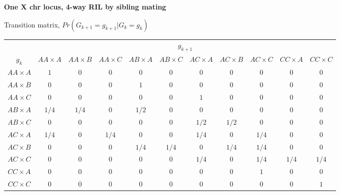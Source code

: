\documentclass[12pt]{article}
\begin{document}
\textbf{\sffamily One X chr locus, 4-way RIL by sibling mating}
\bigskip

\begin{center}
Transition matrix, $Pr(G_{k+1}=g_{k+1} | G_k = g_k)$ \\[6pt]
\renewcommand{\arraystretch}{1.5}\begin{tabular}{ccccccccccc} \hline
& \multicolumn{10}{c}{$g_{k+1}$} \\ \cline{2-11}
$g_k$ & $AA \times A$ & $AA \times B$ & $AA \times C$ & $AB \times A$ & $AB \times C$ & $AC \times A$ & $AC \times B$ & $AC \times C$ & $CC \times A$ & $CC \times C$  \\ \hline 
$AA \times A$ & $1$ & $0$ & $0$ & $0$ & $0$ & $0$ & $0$ & $0$ & $0$ & $0$ \\ 
$AA \times B$ & $0$ & $0$ & $0$ & $1$ & $0$ & $0$ & $0$ & $0$ & $0$ & $0$ \\ 
$AA \times C$ & $0$ & $0$ & $0$ & $0$ & $0$ & $1$ & $0$ & $0$ & $0$ & $0$ \\ 
$AB \times A$ & $1/4$ & $1/4$ & $0$ & $1/2$ & $0$ & $0$ & $0$ & $0$ & $0$ & $0$ \\ 
$AB \times C$ & $0$ & $0$ & $0$ & $0$ & $0$ & $1/2$ & $1/2$ & $0$ & $0$ & $0$ \\ 
$AC \times A$ & $1/4$ & $0$ & $1/4$ & $0$ & $0$ & $1/4$ & $0$ & $1/4$ & $0$ & $0$ \\ 
$AC \times B$ & $0$ & $0$ & $0$ & $1/4$ & $1/4$ & $0$ & $1/4$ & $1/4$ & $0$ & $0$ \\ 
$AC \times C$ & $0$ & $0$ & $0$ & $0$ & $0$ & $1/4$ & $0$ & $1/4$ & $1/4$ & $1/4$ \\ 
$CC \times A$ & $0$ & $0$ & $0$ & $0$ & $0$ & $0$ & $0$ & $1$ & $0$ & $0$ \\ 
$CC \times C$ & $0$ & $0$ & $0$ & $0$ & $0$ & $0$ & $0$ & $0$ & $0$ & $1$ \\ 
\hline
\end{tabular}
\end{center}
\end{document}
